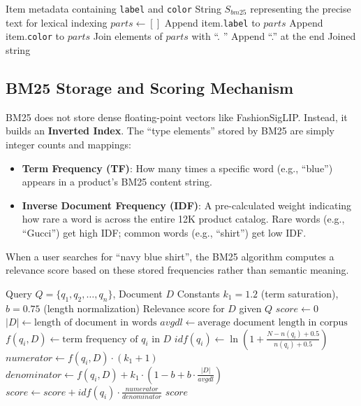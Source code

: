 \begin{algorithm}[H]
\caption{BM25 Content Composition for Lexical Retrieval}\label{alg:bm25_composition}
\begin{algorithmic}[1]
\Require Item metadata containing \texttt{label} and \texttt{color}
\Ensure String $S_{bm25}$ representing the precise text for lexical indexing
    \State $parts \gets []$
        \State Append item.\texttt{label} to $parts$
    \EndIf
        \State Append item.\texttt{color} to $parts$
    \EndIf
    \State Join elements of $parts$ with ``. ''
        \State Append ``.'' at the end
    \EndIf
    \State \Return Joined string
\EndFunction
\end{algorithmic}
\end{algorithm}

\subsection{BM25 Storage and Scoring Mechanism}
BM25 does not store dense floating-point vectors like FashionSigLIP. Instead, it builds an \textbf{Inverted Index}. The ``type elements'' stored by BM25 are simply integer counts and mappings:
\begin{itemize}
    \item \textbf{Term Frequency (TF)}: How many times a specific word (e.g., ``blue'') appears in a product's BM25 content string.
    \item \textbf{Inverse Document Frequency (IDF)}: A pre-calculated weight indicating how rare a word is across the entire 12K product catalog. Rare words (e.g., ``Gucci'') get high IDF; common words (e.g., ``shirt'') get low IDF.
\end{itemize}
When a user searches for ``navy blue shirt'', the BM25 algorithm computes a relevance score based on these stored frequencies rather than semantic meaning.

\begin{algorithm}[H]
\caption{BM25 Scoring Algorithm}\label{alg:bm25_scoring}
\begin{algorithmic}[1]
\Require Query $Q = \{q_1, q_2, \ldots, q_n\}$, Document $D$
\Require Constants $k_1 = 1.2$ (term saturation), $b = 0.75$ (length normalization)
\Ensure Relevance score for $D$ given $Q$
    \State $score \gets 0$
    \State $|D| \gets \text{length of document in words}$
    \State $avgdl \gets \text{average document length in corpus}$
        \State $f(q_i, D) \gets \text{term frequency of } q_i \text{ in } D$
        \State $idf(q_i) \gets \ln\left(1 + \frac{N - n(q_i) + 0.5}{n(q_i) + 0.5}\right)$
        \State $numerator \gets f(q_i, D) \cdot (k_1 + 1)$
        \State $denominator \gets f(q_i, D) + k_1 \cdot \left(1 - b + b \cdot \frac{|D|}{avgdl}\right)$
        \State $score \gets score + idf(q_i) \cdot \frac{numerator}{denominator}$
    \EndFor
    \State \Return $score$
\EndFunction
\end{algorithmic}
\end{algorithm}

